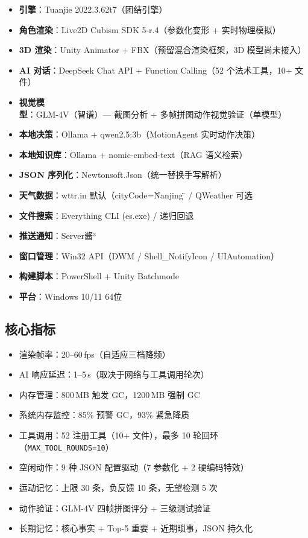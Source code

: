 \documentclass[12pt,a4paper]{ctexart}
\begin{document}
\begin{itemize}
    \item \textbf{引擎}：Tuanjie 2022.3.62t7（团结引擎）
    \item \textbf{角色渲染}：Live2D Cubism SDK 5-r.4（参数化变形 + 实时物理模拟）
    \item \textbf{3D 渲染}：Unity Animator + FBX（预留混合渲染框架，3D 模型尚未接入）
    \item \textbf{AI 对话}：DeepSeek Chat API + Function Calling（52 个法术工具，10+ 文件）
    \item \textbf{视觉模型}：GLM-4V（智谱）--- 截图分析 + 多帧拼图动作视觉验证（单模型）
    \item \textbf{本地决策}：Ollama + qwen2.5:3b（MotionAgent 实时动作决策）
    \item \textbf{本地知识库}：Ollama + nomic-embed-text（RAG 语义检索）
    \item \textbf{JSON 序列化}：Newtonsoft.Json（统一替换手写解析）
    \item \textbf{天气数据}：wttr.in 默认（cityCode=\"Nanjing\"） / QWeather 可选
    \item \textbf{文件搜索}：Everything CLI (es.exe) / 递归回退
    \item \textbf{推送通知}：Server酱³
    \item \textbf{窗口管理}：Win32 API（DWM / Shell\_NotifyIcon / UIAutomation）
    \item \textbf{构建脚本}：PowerShell + Unity Batchmode
    \item \textbf{平台}：Windows 10/11 64位
\end{itemize}

\subsection{核心指标}

\begin{itemize}
    \item 渲染帧率：20--60\,fps（自适应三档降频）
    \item AI 响应延迟：1--5\,s（取决于网络与工具调用轮次）
    \item 内存管理：800\,MB 触发 GC，1200\,MB 强制 GC
    \item 系统内存监控：85\% 预警 GC，93\% 紧急降质
    \item 工具调用：52 注册工具（10+ 文件），最多 10 轮回环（\texttt{MAX\_TOOL\_ROUNDS=10}）
    \item 空闲动作：9 种 JSON 配置驱动（7 参数化 + 2 硬编码特效）
    \item 运动记忆：上限 30 条，负反馈 10 条，无望检测 5 次
    \item 动作验证：GLM-4V 四帧拼图评分 + 三级测试验证
    \item 长期记忆：核心事实 + Top-5 重要 + 近期琐事，JSON 持久化
\end{itemize}
\end{document}

